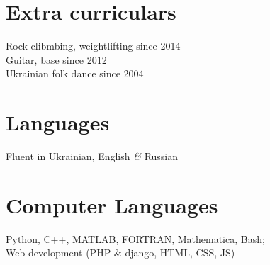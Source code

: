 \documentclass[margin,line]{res}
\begin{document}
\begin{resume}
\section{\sc Extra curriculars}

Rock clibmbing, weightlifting \hfill{since 2014}\\
Guitar, base \hfill{since 2012}\\
Ukrainian folk dance \hfill{since 2004}


\section{\sc Languages}

Fluent in Ukrainian, English \textit{\&} Russian
\section{\sc Computer Languages}

Python, C++, MATLAB, FORTRAN, Mathematica, Bash;\\
Web development (PHP \& django, HTML, CSS, JS)
\end{resume}
\end{document}
